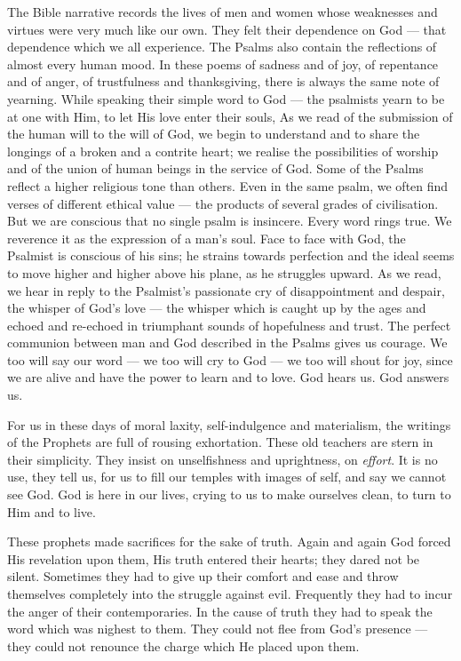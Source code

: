 The Bible narrative records the lives of
men and women whose weaknesses and
virtues were very much like our own. They
felt their dependence on God — that dependence
which we all experience. The Psalms
also contain the reflections of almost every
human mood. In these poems of sadness and
of joy, of repentance and of anger, of trustfulness
and thanksgiving, there is always the
same note of yearning. While speaking their
simple word to God — the psalmists yearn to
be at one with Him, to let His love enter their
souls, As we read of the submission of the
human will to the will of God, we begin to
understand and to share the longings of a
broken and a contrite heart; we realise the
possibilities of worship and of the union of
human beings in the service of God. Some
of the Psalms reflect a higher religious tone
than others. Even in the same psalm, we
often find verses of different ethical value —
the products of several grades of civilisation.
But we are conscious that no single psalm is
insincere. Every word rings true. We
reverence it as the expression of a man’s
soul. Face to face with God, the Psalmist is
conscious of his sins; he strains towards perfection
and the ideal seems to move higher
and higher above his plane, as he struggles
upward. As we read, we hear in reply to the
Psalmist’s passionate cry of disappointment
and despair, the whisper of God’s love — the
whisper which is caught up by the ages and
echoed and re-echoed in triumphant sounds
of hopefulness and trust. The perfect communion
between man and God described in
the Psalms gives us courage. We too will
say our word — we too will cry to God — we
too will shout for joy, since we are alive and
have the power to learn and to love. God
hears us. God answers us.

For us in these days of moral laxity, self-indulgence
and materialism, the writings of
the Prophets are full of rousing exhortation.
These old teachers are stern in their simplicity.
They insist on unselfishness and uprightness,
on \textsl{effort}. It is no use, they tell us, for us to
fill our temples with images of self, and say
we cannot see God. God is here in our lives,
crying to us to make ourselves clean, to turn
to Him and to live.

These prophets made sacrifices for the
sake of truth. Again and again God forced
His revelation upon them, His truth entered
their hearts; they dared not be silent.
Sometimes they had to give up their comfort
and ease and throw themselves completely
into the struggle against evil. Frequently
they had to incur the anger of their
contemporaries. In the cause of truth
they had to speak the word which was
nighest to them. They could not flee
from God’s presence — they could not
renounce the charge which He placed upon
them.

